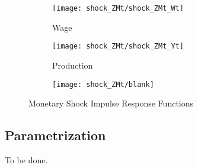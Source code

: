 \documentclass[
thesis.tex
]{subfiles}
\begin{document}
\begin{figure}[h!]
		\vspace*{0.5cm}
		
		\begin{subfigure}[b]{0.3\textwidth}
			\centering
			\texttt{[image: shock\_ZMt/shock\_ZMt\_Wt]}
			\caption{Wage}
			\label{fig:ZMt-wage}
		\end{subfigure}
		\hfill
		\begin{subfigure}[b]{0.3\textwidth}
			\centering
			\texttt{[image: shock\_ZMt/shock\_ZMt\_Yt]}
			\caption{Production}
			\label{fig:ZMt-production}
		\end{subfigure}
		\hfill
		\begin{subfigure}[b]{0.3\textwidth}
			\centering
			\texttt{[image: shock\_ZMt/blank]}
		\end{subfigure}
		\hfill
		\caption{Monetary Shock Impulse Response Functions}
		\label{fig:ZMt-irf}
	\end{figure}
	
	\newpage
	
	\subsection{Parametrization}
	
	To be done.
\end{document}
